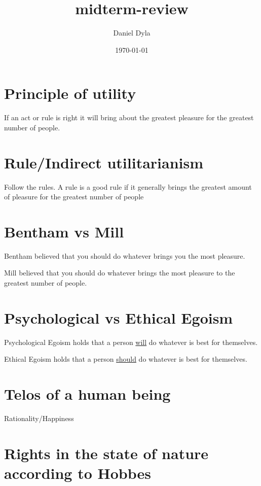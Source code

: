 \documentclass[11pt]{article}
\author{Daniel Dyla}
\date{\today}
\title{midterm-review}
\begin{document}
\maketitle
\tableofcontents

\section{Principle of utility}
\label{sec-1}

If an act or rule is right it will bring about the greatest pleasure
for the greatest number of people.

\section{Rule/Indirect utilitarianism}
\label{sec-2}

Follow the rules. A rule is a good rule if it generally brings the
greatest amount of pleasure for the greatest number of people


\section{Bentham vs Mill}
\label{sec-3}

Bentham believed that you should do whatever brings you the most
pleasure.

Mill believed that you should do whatever brings the most pleasure to
the greatest number of people.

\section{Psychological vs Ethical Egoism}
\label{sec-4}

Psychological Egoism holds that a person \uline{will} do whatever is best
for themselves.

Ethical Egoism holds that a person \uline{should} do whatever is best for
themselves.

\section{Telos of a human being}
\label{sec-5}

Rationality/Happiness

\section{Rights in the state of nature according to Hobbes}
\label{sec-6}
\end{document}
